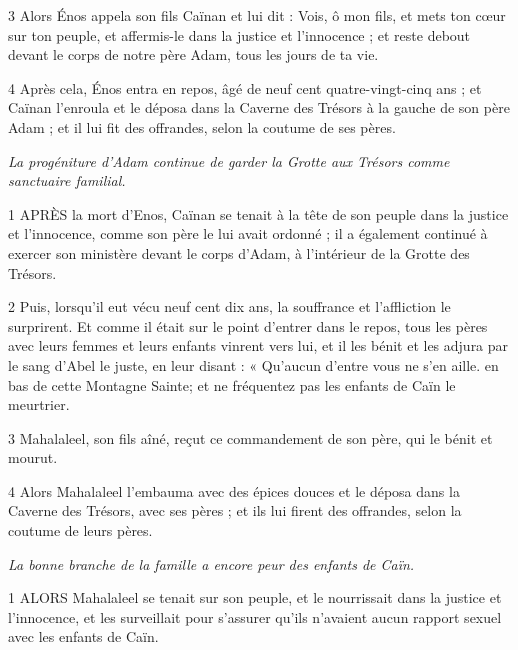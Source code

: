 \par 3 Alors Énos appela son fils Caïnan et lui dit : Vois, ô mon fils, et mets ton cœur sur ton peuple, et affermis-le dans la justice et l'innocence ; et reste debout devant le corps de notre père Adam, tous les jours de ta vie.

\par 4 Après cela, Énos entra en repos, âgé de neuf cent quatre-vingt-cinq ans ; et Caïnan l'enroula et le déposa dans la Caverne des Trésors à la gauche de son père Adam ; et il lui fit des offrandes, selon la coutume de ses pères.


\par \textit{La progéniture d'Adam continue de garder la Grotte aux Trésors comme sanctuaire familial.}

\par 1 APRÈS la mort d'Enos, Caïnan se tenait à la tête de son peuple dans la justice et l'innocence, comme son père le lui avait ordonné ; il a également continué à exercer son ministère devant le corps d'Adam, à l'intérieur de la Grotte des Trésors.

\par 2 Puis, lorsqu'il eut vécu neuf cent dix ans, la souffrance et l'affliction le surprirent. Et comme il était sur le point d'entrer dans le repos, tous les pères avec leurs femmes et leurs enfants vinrent vers lui, et il les bénit et les adjura par le sang d'Abel le juste, en leur disant : « Qu'aucun d'entre vous ne s'en aille. en bas de cette Montagne Sainte; et ne fréquentez pas les enfants de Caïn le meurtrier.

\par 3 Mahalaleel, son fils aîné, reçut ce commandement de son père, qui le bénit et mourut.

\par 4 Alors Mahalaleel l'embauma avec des épices douces et le déposa dans la Caverne des Trésors, avec ses pères ; et ils lui firent des offrandes, selon la coutume de leurs pères.




\par \textit{La bonne branche de la famille a encore peur des enfants de Caïn.}

\par 1 ALORS Mahalaleel se tenait sur son peuple, et le nourrissait dans la justice et l'innocence, et les surveillait pour s'assurer qu'ils n'avaient aucun rapport sexuel avec les enfants de Caïn.

